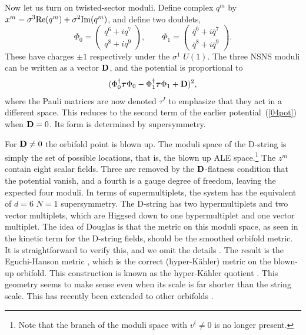 \documentclass[12pt]{article}
\def\D{{\bf D}}
\begin{document}
Now let us turn on twisted-sector moduli.  Define complex $q^m$ 
by $x^m = \sigma^3 {\rm Re}(q^m) + \sigma^2 {\rm Im}(q^m)$, and define two
doublets,
\begin{equation}
\Phi_0 = \left( \begin{array}{c} q^6 + i q^7 \\ q^8 + i q^9
\end{array} \right), \qquad
\Phi_1 = \left( \begin{array}{c} \bar q^6 + i \bar q^7 \\ \bar q^8 + i
\bar q^9
\end{array} \right).
\end{equation}
These have charges $\pm 1$ respectively under the $\sigma^1$ $U(1)$.
The three NSNS moduli can be written as a vector $\D$,
and the potential is proportional to
\begin{equation}
(\Phi_0^\dagger \mbox{\boldmath$\tau$} \Phi_0 - \Phi_1^\dagger
\mbox{\boldmath$\tau$} \Phi_1 + \D)^2,
\end{equation}
where the Pauli matrices are now denoted $\tau^I$ to emphasize that they
act in a different space.  This reduces to the second term of the
earlier potential~(\ref{04pot}) when $\D = 0$.  Its form
is determined by supersymmetry.

For $\D \neq 0$ the
orbifold point is blown up.  The moduli space
of the D-string is simply the set of possible locations, that is, the
blown up ALE space.\footnote
{Note that the branch of the
moduli space with $v^i \neq 0$ is no longer present.}  The $z^m$ contain
eight scalar fields.  Three are removed by the $\D$-flatness condition
that the potential vanish, and a fourth is a gauge degree of freedom,
leaving the expected four moduli.  In terms of supermultiplets, the
system has the equivalent of $d=6$ $N=1$ supersymmetry.  The D-string
has two hypermultiplets and two vector multiplets, which
are Higgsed down to one
hypermultiplet and one vector multiplet. 
The idea of
Douglas \cite{dougprobe} is that the metric on this moduli space, as seen in
the kinetic term for the D-string fields, should be the smoothed orbifold
metric.  It is straightforward to verify this, and we omit the
details \cite{tensors}.  The result is the Eguchi-Hanson metric \cite{ale}, which
is the correct (hyper-K\"ahler) metric on the blown-up orbifold.  This
construction is known as the hyper-K\"ahler quotient \cite{hyper}.  This
geometry seems to make sense even when its scale is far shorter than the
string scale.  This has recently been extended to other
orbifolds \cite{cvjmyers}.
\end{document}
